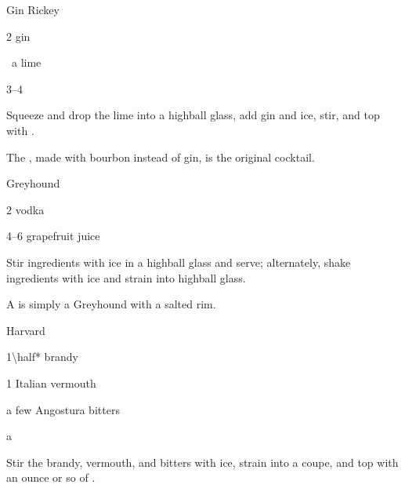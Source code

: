 \begin{Cocktail}{Gin Rickey}
	\begin{Ingredients}
	\item \SI{2}{\oz} gin
	\item \half\ a lime
	\item \SIrange{3}{4}{\oz} \soda
	\end{Ingredients}
	
	\begin{Instructions}
	Squeeze and drop the lime into a highball glass, add gin and ice, stir, and top with \soda.
	
	The , made with bourbon instead of gin, is the original  cocktail.
	\end{Instructions}
\end{Cocktail}

\begin{Cocktail}{Greyhound}
	\begin{Ingredients}
	\item \SI{2}{\oz} vodka
	\item \SIrange{4}{6}{\oz} grapefruit juice
	\end{Ingredients}
	
	\begin{Instructions}
	Stir ingredients with ice in a highball glass and serve; alternately, shake ingredients with ice and strain into highball glass.
	
	A  is simply a Greyhound with a salted rim.
	\end{Instructions}
\end{Cocktail}

\begin{Cocktail}{Harvard}
	\begin{Ingredients}
	\item \SI{1\half*}{\oz} brandy
	\item \SI{1}{\oz} Italian vermouth
	\item a few \si{\dashes} Angostura bitters
	\item a \si{\splash} \soda
	\end{Ingredients}
	
	\begin{Instructions}
	Stir the brandy, vermouth, and bitters with ice, strain into a coupe, and top with an ounce or so of \soda.
	\end{Instructions}
\end{Cocktail}

